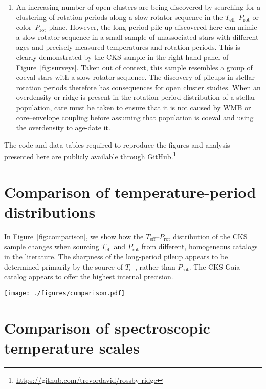 \documentclass[trackchanges,twocolumn]{aastex631}
\newcommand{\teff}{\ensuremath{T_{\mathrm{eff}}}\xspace}
\newcommand{\prot}{\ensuremath{P_\mathrm{rot}}\xspace}
\begin{document}
\begin{enumerate}
    \item An increasing number of open clusters are being discovered by searching for a clustering of rotation periods along a slow-rotator sequence in the \teff–\prot or color–\prot plane. However, the long-period pile up discovered here can mimic a slow-rotator sequence in a small sample of unassociated stars with different ages and precisely measured temperatures and rotation periods. This is clearly demonstrated by the CKS sample in the right-hand panel of Figure~\ref{fig:surveys}. Taken out of context, this sample resembles a group of coeval stars with a slow-rotator sequence. The discovery of pileups in stellar rotation periods therefore has consequences for open cluster studies. When an overdensity or ridge is present in the rotation period distribution of a stellar population, care must be taken to ensure that it is not caused by WMB or core–envelope coupling before assuming that population is coeval and using the overdensity to age-date it.
    
\end{enumerate}

The code and data tables required to reproduce the figures and analysis presented here are publicly available through GitHub.\footnote{\url{https://github.com/trevordavid/rossby-ridge}}

\appendix
\section{Comparison of temperature-period distributions}\label{app:teffprot}
In Figure~\ref{fig:comparison}, we show how the \teff--\prot distribution of the CKS sample changes when sourcing \teff and \prot from different, homogeneous catalogs in the literature. The sharpness of the long-period pileup appears to be determined primarily by the source of \teff, rather than \prot. The CKS-Gaia catalog \citep{Fulton2018} appears to offer the highest internal precision.  

\begin{figure*}
    \centering
    \texttt{[image: ./figures/comparison.pdf]}
    \caption{Comparison of the \teff--\prot distribution for the CKS sample using rotation periods and \teff from the sources indicated by the axes labels.}
    \label{fig:comparison}
\end{figure*}

\section{Comparison of spectroscopic temperature scales}\label{app:teff}
\end{document}
